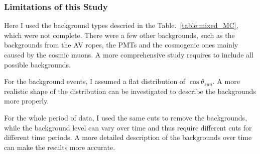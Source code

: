 \subsubsection{Limitations of this Study}
Here I used the background types descried in the Table.~\ref{table:mixed_MC}, which were not complete. There were a few other backgrounds, such as the backgrounds from the AV ropes, the PMTs and the cosmogenic ones mainly caused by the cosmic muons. A more comprehensive study requires to include all possible backgrounds.

For the background events, I assumed a flat distribution of $\cos\theta_{sun}$. A more realistic shape of the distribution can be investigated to describe the backgrounds more properly.

For the whole period of data, I used the same cuts to remove the backgrounds, while the background level can vary over time and thus require different cuts for different time periods. A more detailed description of the backgrounds over time can make the results more accurate. 